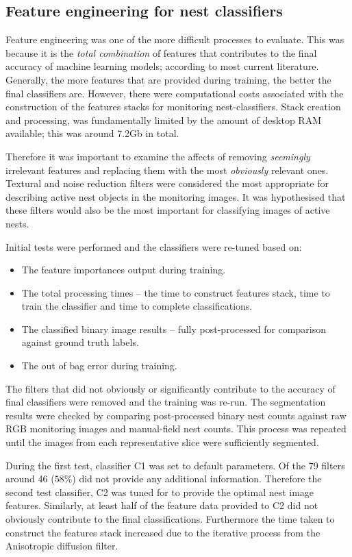 \subsection{Feature engineering for nest classifiers}\label{sec:feature-engineering-for-nest-classifiers}
Feature engineering was one of the more difficult processes to evaluate. This was because it is the \emph{total combination} of features that contributes to the final accuracy of machine learning models; according to most current literature. Generally, the more features that are provided during training, the better the final classifiers are. However, there were computational costs associated with the construction of the features stacks for monitoring nest-classifiers. Stack creation and processing, was fundamentally limited by the amount of desktop RAM available; this was around 7.2Gb in total. 

Therefore it was important to examine the affects of removing \emph{seemingly} irrelevant features and replacing them with the most \emph{obviously} relevant ones. Textural and noise reduction filters were considered the most appropriate for describing active nest objects in the monitoring images. It was hypothesised that these filters would also be the most important for classifying images of active nests.

Initial tests were performed and the classifiers were re-tuned based on:

\begin{itemize}
\item The feature importances output during training.
\item The total processing times -- the time to construct features stack, time to train the classifier and time to complete classifications.
\item The classified binary image results -- fully post-processed for comparison against ground truth labels.
\item The out of bag error during training.
\end{itemize}

The filters that did not obviously or significantly contribute to the accuracy of final classifiers were removed and the training was re-run. The segmentation results were checked by comparing post-processed binary nest counts against raw \ac{RGB} monitoring images and manual-field nest counts. This process was repeated until the images from each representative slice were sufficiently segmented.

During the first test, classifier C1 was set to default parameters. Of the 79 filters around 46 ($58\%$) did not provide any additional information. Therefore the second test classifier, C2 was tuned for to provide the optimal nest image features. Similarly, at least half of the feature data provided to C2 did not obviously contribute to the final classifications. Furthermore the time taken to construct the features stack increased due to the iterative process from the Anisotropic diffusion filter. 

